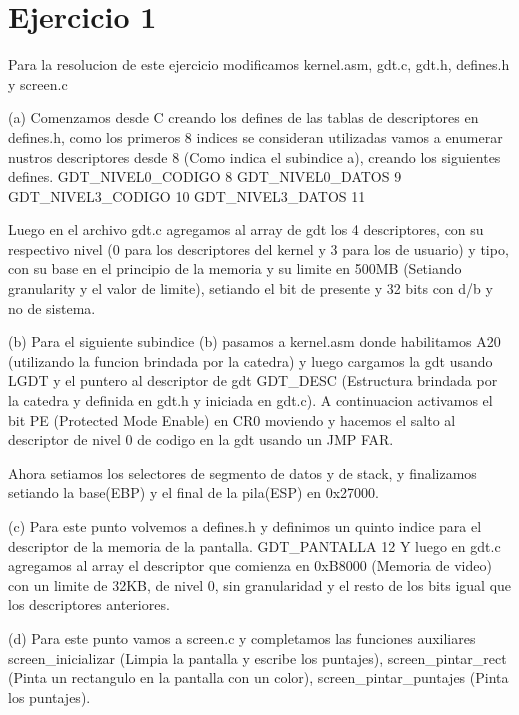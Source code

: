 \section{Ejercicio 1}

Para la resolucion de este ejercicio modificamos kernel.asm, gdt.c, gdt.h, defines.h y screen.c

(a)
Comenzamos desde C creando los defines de las tablas de descriptores en defines.h, como los primeros 8 indices se consideran utilizadas vamos a enumerar nustros descriptores desde 8 (Como indica el subindice a), creando los siguientes defines.
GDT_NIVEL0_CODIGO	8
GDT_NIVEL0_DATOS	9
GDT_NIVEL3_CODIGO   10
GDT_NIVEL3_DATOS    11

Luego en el archivo gdt.c agregamos al array de gdt los 4 descriptores, con su respectivo nivel (0 para los descriptores del kernel y 3 para los de usuario) y tipo, con su base en el principio de la memoria y su limite en 500MB (Setiando granularity y el valor de limite), setiando el bit de presente y 32 bits con d/b y no de sistema.

(b)
Para el siguiente subindice (b) pasamos a kernel.asm donde habilitamos A20 (utilizando la funcion brindada por la catedra) y luego cargamos la gdt usando LGDT y el puntero al descriptor de gdt GDT_DESC (Estructura brindada por la catedra y definida en gdt.h y iniciada en gdt.c). A continuacion activamos el bit PE (Protected Mode Enable) en CR0 moviendo y hacemos el salto al descriptor de nivel 0 de codigo en la gdt usando un JMP FAR.

Ahora setiamos los selectores de segmento de datos y de stack, y finalizamos setiando la base(EBP) y el final de la pila(ESP) en 0x27000.

(c)
Para este punto volvemos a defines.h y definimos un quinto indice para el descriptor de la memoria de la pantalla.
GDT_PANTALLA	12
Y luego en gdt.c agregamos al array el descriptor que comienza en 0xB8000 (Memoria de video) con un limite de 32KB, de nivel 0, sin granularidad y el resto de los bits igual que los descriptores anteriores.

(d)
Para este punto vamos a screen.c y completamos las funciones auxiliares screen_inicializar (Limpia la pantalla y escribe los puntajes), screen_pintar_rect (Pinta un rectangulo en la pantalla con un color), screen_pintar_puntajes (Pinta los puntajes).